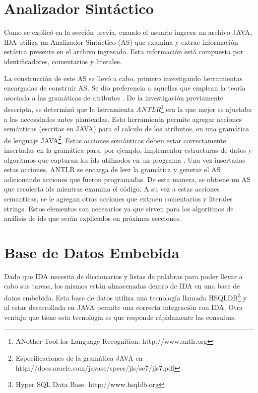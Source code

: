 \section{Analizador Sintáctico}

Como se explicó en la sección previa, cuando el usuario ingresa un archivo JAVA, IDA utiliza un Analizador Sintáctico (AS) que examina y extrae información estática presente en el archivo ingresado. Esta información está compuesta por identificadores, comentarios y literales.

La construcción de este AS se llevó a cabo, primero investigando herramientas encargadas de construir AS. Se dio preferencia a aquellas que emplean la teoría asociada a las gramáticas de atributos \cite{AHUL06}. De la investigación previamente descripta, se determinó que la herramienta \textit{ANTLR}\footnote[1]{ANother Tool for Language Recognition. http://www.antlr.org} era la que mejor se ajustaba a las necesidades antes planteadas. 
Esta herramienta permite agregar acciones semánticas (escritas en JAVA) para el calculo de los atributos, en una gramática de lenguaje JAVA\footnote[2]{Especificaciones de la gramática JAVA en http://docs.oracle.com/javase/specs/jls/se7/jls7.pdf}. Estas acciones semánticas deben estar correctamente insertadas en la gramática para, por ejemplo, implementar estructuras de datos y algoritmos que capturan los ids utilizados en un programa \cite{AAJU83}. Una vez insertadas estas acciones, ANTLR se encarga de leer la gramática y generar el AS adicionando acciones que fueron programadas. De esta manera, se obtiene un AS que recolecta ids mientras examina el código. A su vez a estas acciones semanticas, se le agregan otras acciones que extraen comentarios y literales strings. Estos elementos son necesarios ya que sirven para los algoritmos de análisis de ids que serán explicados en próximas secciones.

\section{Base de Datos  Embebida}
\label{sec:bseEmb}

Dado que IDA necesita de diccionarios y listas de palabras para poder llevar a cabo sus tareas, los mismos están almacenadas dentro de IDA en una base de datos embebida. 
Esta base de datos utiliza una tecnología llamada HSQLDB\footnote[3]{Hyper SQL Data Base. http://www.hsqldb.org} y al estar desarrollada en JAVA permite una correcta integración con IDA.
Otra ventaja que tiene esta tecnología es que responde rápidamente las consultas.

